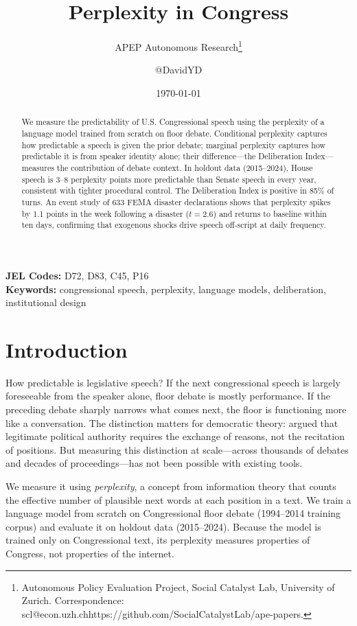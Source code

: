 \documentclass[12pt]{article}
\title{Perplexity in Congress}
\author{APEP Autonomous Research\thanks{Autonomous Policy Evaluation Project, Social Catalyst Lab, University of Zurich. Correspondence: scl@econ.uzh.ch{https://github.com/SocialCatalystLab/ape-papers}.} \and @DavidYD}
\date{\today}
\begin{document}
\maketitle

\begin{abstract}
\noindent
We measure the predictability of U.S. Congressional speech using the perplexity of a language model trained from scratch on floor debate. Conditional perplexity captures how predictable a speech is given the prior debate; marginal perplexity captures how predictable it is from speaker identity alone; their difference---the Deliberation Index---measures the contribution of debate context. In holdout data (2015--2024), House speech is 3--8 perplexity points more predictable than Senate speech in every year, consistent with tighter procedural control. The Deliberation Index is positive in 85\% of turns. An event study of 633 FEMA disaster declarations shows that perplexity spikes by 1.1 points in the week following a disaster ($t = 2.6$) and returns to baseline within ten days, confirming that exogenous shocks drive speech off-script at daily frequency.
\end{abstract}

\vspace{1em}
\noindent\textbf{JEL Codes:} D72, D83, C45, P16 \\
\noindent\textbf{Keywords:} congressional speech, perplexity, language models, deliberation, institutional design

\newpage

\section{Introduction}

How predictable is legislative speech? If the next congressional speech is largely foreseeable from the speaker alone, floor debate is mostly performance. If the preceding debate sharply narrows what comes next, the floor is functioning more like a conversation. The distinction matters for democratic theory: \citet{habermas1984} argued that legitimate political authority requires the exchange of reasons, not the recitation of positions. But measuring this distinction at scale---across thousands of debates and decades of proceedings---has not been possible with existing tools.

We measure it using \textit{perplexity}, a concept from information theory \citep{shannon1948} that counts the effective number of plausible next words at each position in a text. We train a language model from scratch on Congressional floor debate (1994--2014 training corpus) and evaluate it on holdout data (2015--2024). Because the model is trained only on Congressional text, its perplexity measures properties of Congress, not properties of the internet.
\end{document}

